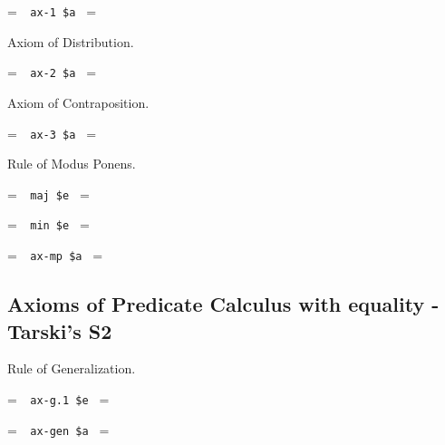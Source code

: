 \setbox\startprefix=\hbox{\tt \ \ ax-1\ \$a\ }
\setbox\contprefix=\hbox{\tt \ \ \ \ \ \ \ \ \ \ }
\startm
\m{\vdash}\m{(}\m{\varphi}\m{\rightarrow}\m{(}\m{\psi}\m{\rightarrow}\m{\varphi}\m{)}
\m{)}
\endm

\noindent Axiom of Distribution.

\setbox\startprefix=\hbox{\tt \ \ ax-2\ \$a\ }
\setbox\contprefix=\hbox{\tt \ \ \ \ \ \ \ \ \ \ }
\startm
\m{\vdash}\m{(}\m{(}\m{\varphi}\m{\rightarrow}\m{(}\m{\psi}\m{\rightarrow}\m{\chi}
\m{)}\m{)}\m{\rightarrow}\m{(}\m{(}\m{\varphi}\m{\rightarrow}\m{\psi}\m{)}\m{
\rightarrow}\m{(}\m{\varphi}\m{\rightarrow}\m{\chi}\m{)}\m{)}\m{)}
\endm

\noindent Axiom of Contraposition.

\setbox\startprefix=\hbox{\tt \ \ ax-3\ \$a\ }
\setbox\contprefix=\hbox{\tt \ \ \ \ \ \ \ \ \ \ }
\startm
\m{\vdash}\m{(}\m{(}\m{\lnot}\m{\varphi}\m{\rightarrow}\m{\lnot}\m{\psi}\m{)}\m{
\rightarrow}\m{(}\m{\psi}\m{\rightarrow}\m{\varphi}\m{)}\m{)}
\endm


\noindent Rule of Modus Ponens.\label{axmp}

\setbox\startprefix=\hbox{\tt \ \ maj\ \$e\ }
\setbox\contprefix=\hbox{\tt \ \ \ \ \ \ \ \ \ }
\startm
\m{\vdash}\m{(}\m{\varphi}\m{\rightarrow}\m{\psi}\m{)}
\endm

\setbox\startprefix=\hbox{\tt \ \ min\ \$e\ }
\setbox\contprefix=\hbox{\tt \ \ \ \ \ \ \ \ \ }
\startm
\m{\vdash}\m{\varphi}
\endm

\setbox\startprefix=\hbox{\tt \ \ ax-mp\ \$a\ }
\setbox\contprefix=\hbox{\tt \ \ \ \ \ \ \ \ \ \ \ }
\startm
\m{\vdash}\m{\psi}
\endm


\subsection{Axioms of Predicate Calculus with equality - Tarski's S2}

\noindent Rule of Generalization.

\setbox\startprefix=\hbox{\tt \ \ ax-g.1\ \$e\ }
\setbox\contprefix=\hbox{\tt \ \ \ \ \ \ \ \ \ \ \ \ }
\startm
\m{\vdash}\m{\varphi}
\endm

\setbox\startprefix=\hbox{\tt \ \ ax-gen\ \$a\ }
\setbox\contprefix=\hbox{\tt \ \ \ \ \ \ \ \ \ \ \ \ }
\startm
\m{\vdash}\m{\forall}\m{\varphi}
\endm

